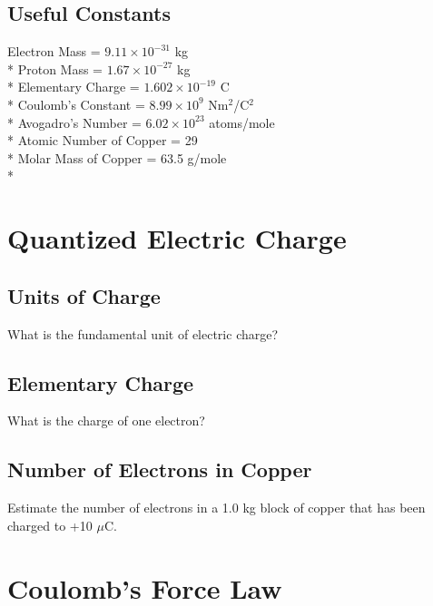 \documentclass[11pt]{article}
\begin{document}
\maketitle
\tableofcontents
\hspace{30mm}

\subsection*{Useful Constants}
Electron Mass = $9.11 \times 10^{-31}$ kg \\*
Proton Mass = $1.67 \times 10^{-27}$ kg \\*
Elementary Charge = $1.602 \times 10^{-19}$ C \\*
Coulomb's Constant = $8.99 \times 10^9$ Nm$^2$/C$^2$ \\*
Avogadro's Number = $ 6.02 \times 10^{23}$ atoms/mole \\*
Atomic Number of Copper = 29 \\*
Molar Mass of Copper = 63.5 g/mole \\*


\pagebreak
\section{Quantized Electric Charge}

\subsection{Units of Charge}
What is the fundamental unit of electric charge?

\subsection{Elementary Charge}
What is the charge of one electron?

\subsection{Number of Electrons in Copper}
Estimate the number of electrons in a 1.0 kg block of copper that has been charged to +10 $\mu$C.


\pagebreak
\section{Coulomb's Force Law}
\end{document}
